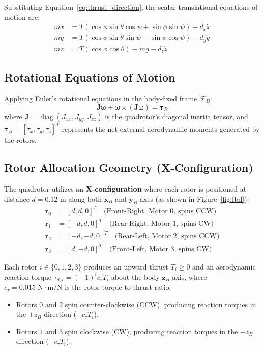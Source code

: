 \documentclass[11pt,a4paper]{article}
\begin{document}
Substituting Equation~\eqref{eq:thrust_direction}, the scalar translational equations of motion are:
\begin{align}
m \ddot{x} &= T (\cos\phi \sin\theta \cos\psi + \sin\phi \sin\psi) - d_x \dot{x} \label{eq:trans_x} \\
m \ddot{y} &= T (\cos\phi \sin\theta \sin\psi - \sin\phi \cos\psi) - d_y \dot{y} \label{eq:trans_y} \\
m \ddot{z} &= T (\cos\phi \cos\theta) - mg - d_z \dot{z} \label{eq:trans_z}
\end{align}

\subsection{Rotational Equations of Motion}
Applying Euler's rotational equations in the body-fixed frame $\mathcal{F}_B$:
\begin{equation}
\mathbf{J} \mathbf{\dot{\omega}} + \boldsymbol{\omega} \times (\mathbf{J} \boldsymbol{\omega}) = \boldsymbol{\tau}_B
\label{eq:rot_dynamics}
\end{equation}
where $\mathbf{J} = \operatorname{diag}(J_{xx}, J_{yy}, J_{zz})$ is the quadrotor's diagonal inertia tensor, and $\boldsymbol{\tau}_B = [\tau_x, \tau_y, \tau_z]^T$ represents the net external aerodynamic moments generated by the rotors.

\subsection{Rotor Allocation Geometry (X-Configuration)}
The quadrotor utilizes an \textbf{X-configuration} where each rotor is positioned at distance $d = 0.12\text{ m}$ along both $\mathbf{x}_B$ and $\mathbf{y}_B$ axes (as shown in Figure~\ref{fig:fbd}):
\begin{align}
\mathbf{r}_0 &= [ d,  d, 0]^T \quad \text{(Front-Right, Motor 0, spins CCW)} \\
\mathbf{r}_1 &= [-d,  d, 0]^T \quad \text{(Rear-Right,  Motor 1, spins CW)} \\
\mathbf{r}_2 &= [-d, -d, 0]^T \quad \text{(Rear-Left,   Motor 2, spins CCW)} \\
\mathbf{r}_3 &= [ d, -d, 0]^T \quad \text{(Front-Left,  Motor 3, spins CW)}
\end{align}

Each rotor $i \in \{0, 1, 2, 3\}$ produces an upward thrust $T_i \geq 0$ and an aerodynamic reaction torque $\tau_{d,i} = (-1)^i c_\tau T_i$ about the body $\mathbf{z}_B$ axis, where $c_\tau = 0.015\text{ N}\cdot\text{m/N}$ is the rotor torque-to-thrust ratio:
\begin{itemize}
    \item Rotors $0$ and $2$ spin counter-clockwise (CCW), producing reaction torques in the $+z_B$ direction ($+c_\tau T_i$).
    \item Rotors $1$ and $3$ spin clockwise (CW), producing reaction torques in the $-z_B$ direction ($-c_\tau T_i$).
\end{itemize}
\end{document}
